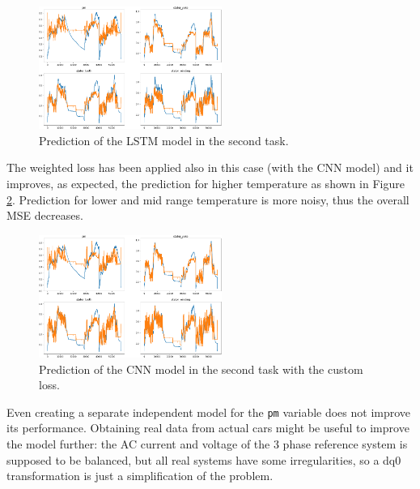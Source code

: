 \begin{figure}[!h]
    \centering
    \includegraphics[width=\linewidth, height=4cm]{imgs/lstm_pred_second.png}
    \caption{Prediction of the LSTM model in the second task.}
    \label{fig:lstm_second}
\end{figure}


The weighted loss has been applied also in this case (with the CNN model) and it improves, as expected, the prediction for higher temperature as shown in Figure \ref{fig:cnn_second}. Prediction for lower and mid range temperature is more noisy, thus the overall MSE decreases.

\begin{figure}[!h]
    \centering
    \includegraphics[width=\linewidth, height=4cm]{imgs/pred_second_custom_loss.png}
    \caption{Prediction of the CNN model in the second task with the custom loss.}
    \label{fig:cnn_second}
\end{figure}

Even creating a separate independent model for the \verb|pm| variable does not improve its performance.
Obtaining real data from actual cars might be useful to improve the model further: 
the AC current and voltage of the 3 phase reference system is supposed to be balanced, but all real systems have some irregularities, so a dq0 transformation is just a simplification of the problem.



